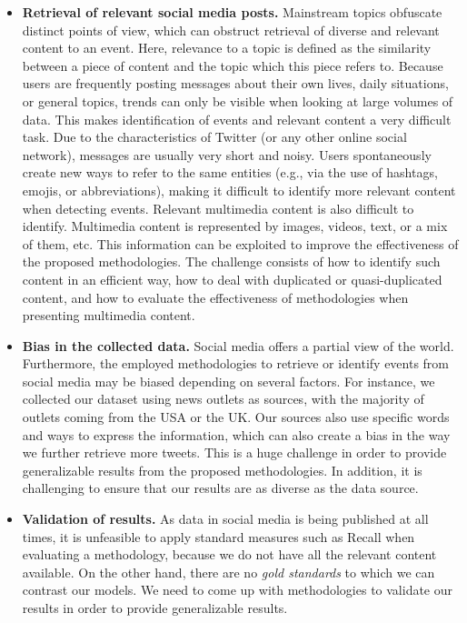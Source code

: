 \begin{itemize}
    \item {\bf Retrieval of relevant social media posts.} 
    Mainstream topics obfuscate distinct points of view, which can
    obstruct retrieval of diverse and relevant content to an event. 
    Here, relevance to a topic is defined as the similarity between a piece of
    content and the topic which this piece refers to.
    Because users are frequently posting messages about their own lives, daily
    situations, or general topics, trends can only be visible when looking at large
    volumes of data. 
    This makes identification of events and relevant content a very difficult task.
    Due to the characteristics of Twitter (or any other online social network),
    messages are usually very short and noisy.
    Users spontaneously create new ways to refer to the same entities
    (e.g., via the use of hashtags, emojis, or abbreviations), making it
    difficult to identify more relevant content when detecting events.
    Relevant multimedia content is also difficult to identify. 
    Multimedia content is represented by images, videos, text, or a mix of them,
    etc. 
    This information can be exploited to improve the effectiveness of
    the proposed methodologies. 
    The challenge consists of how to identify such content in an efficient way,
    how to deal with duplicated or quasi-duplicated content, and how to evaluate
    the effectiveness of methodologies when presenting multimedia content. 

    \item {\bf Bias in the collected data.}
    Social media offers a partial view of the world. 
    Furthermore, the employed methodologies to retrieve or identify events from
    social media may be biased depending on several factors. 
    For instance, we collected our dataset using news outlets as sources, with
    the majority of outlets coming from the USA or the UK. 
    Our sources also use specific words and ways to express the information,
    which can also create a bias in the way we further retrieve more tweets.
    This is a huge challenge in order to provide generalizable results from the
    proposed methodologies. 
    In addition, it is challenging to ensure that our results are as diverse as
    the data source. 

    \item {\bf Validation of results.} 
    As data in social media is being published at all times, it is unfeasible to
    apply standard measures such as Recall when evaluating a methodology,
    because we do not have all the relevant content available.
    On the other hand, there are no {\em gold standards} to which we can
    contrast our models. 
    We need to come up with methodologies to validate our results in order to
    provide generalizable results.
    
\end{itemize}


